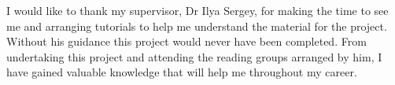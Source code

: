 I would like to thank my supervisor, Dr Ilya Sergey, for making the time to
see me and arranging tutorials to help me understand the material for the project.
Without his guidance this project would never have been completed. From
undertaking this project and attending the reading groups arranged by him,
I have gained valuable knowledge that will help me throughout my career.
